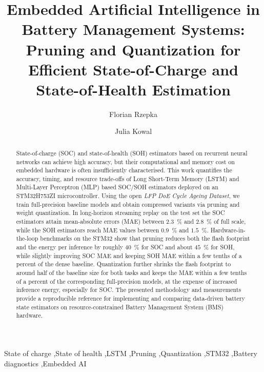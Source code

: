 \documentclass[review]{elsarticle}
\begin{document}
\begin{frontmatter}

\title{Embedded Artificial Intelligence in Battery Management Systems: Pruning and Quantization for Efficient State-of-Charge and State-of-Health Estimation}

\author[1]{Florian Rzepka}

\author[1]{Julia Kowal}



\begin{abstract}
State-of-charge (SOC) and state-of-health (SOH) estimators based on recurrent neural networks can achieve high accuracy, but their computational and memory cost on embedded hardware is often insufficiently characterised. This work quantifies the accuracy, timing, and resource trade-offs of Long Short-Term Memory (LSTM) and Multi-Layer Perceptron (MLP) based SOC/SOH estimators deployed on an STM32H753ZI microcontroller. Using the open \emph{LFP DoE Cycle Ageing Dataset}, we train full-precision baseline models and obtain compressed variants via pruning and weight quantization. In long-horizon streaming replay on the test set the SOC estimators attain mean-absolute errors (MAE) between $2.3$~\% and $2.8$~\% of full scale, while the SOH estimators reach MAE values between $0.9$~\% and $1.5$~\%. Hardware-in-the-loop benchmarks on the STM32 show that pruning reduces both the flash footprint and the energy per inference by roughly $40$~\% for SOC and about $45$~\% for SOH, while slightly improving SOC MAE and keeping SOH MAE within a few tenths of a percent of the dense baseline. Quantization further shrinks the flash footprint to around half of the baseline size for both tasks and keeps the MAE within a few tenths of a percent of the corresponding full-precision models, at the expense of increased inference energy, especially for SOC. The presented methodology and measurements provide a reproducible reference for implementing and comparing data-driven battery state estimators on resource-constrained Battery Management System (BMS) hardware.
\end{abstract}

\begin{keyword}
State of charge \sep State of health \sep LSTM \sep Pruning \sep Quantization \sep STM32 \sep Battery diagnostics \sep Embedded AI
\end{keyword}

\end{frontmatter}
\end{document}
